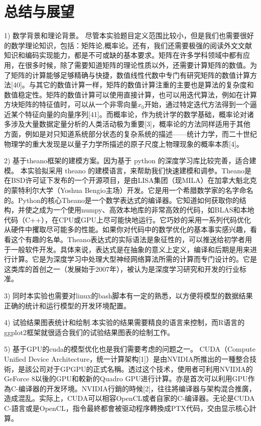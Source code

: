 \documentclass[12pt,a4paper]{article}
\begin{document}
\section{总结与展望}
1) 数学背景和理论背景。 尽管本实验题目定义范围比较小，但是我们也需要很好的数学理论知识，包括：矩阵论,概率论。还有，我们还需要极强的阅读外文文献知识和编码实现能力，都是不可或缺的基本要求。矩阵在许多学科领域中都有应用，在很多时候，除了需要知道矩阵的理论性质以外，还需要计算矩阵的数值。为了矩阵的计算能够足够精确与快捷，数值线性代数中专门有研究矩阵的数值计算方法[40]。与其它的数值计算一样，矩阵的数值计算注重的主要也是算法的复杂度和数值稳定性。矩阵的数值计算可以使用直接计算，也可以用迭代算法，例如在计算方块矩阵的特征值时，可以从一个非零向量$x_0$开始，通过特定迭代方法得到一个逼近某个特征向量的向量序列[41]。而概率论，作为统计学的数学基础，概率论对诸多涉及大量数据定量分析的人类活动极为重要[3]，概率论的方法同样适用于其他方面，例如是对只知道系统部分状态的复杂系统的描述——统计力学，而二十世纪物理学的重大发现是以量子力学所描述的原子尺度上物理现象的概率本质[4]。

2) 基于theano框架的建模方案。因为基于 python 的深度学习库比较完善，适合建模。 本实验拟采用 theano 的建模语言，来帮助我们快速建模和调参。Theano是在BSD许可证下发布的一个开源项目，是由LISA集团（现MILA）在加拿大魁北克的蒙特利尔大学（Yoshua Bengio主场）开发。它是用一个希腊数学家的名字命名的。Python的核心Theano是一个数学表达式的编译器。它知道如何获取你的结构，并使之成为一个使用numpy、高效本地库的非常高效的代码，如BLAS和本地代码（C++），在CPU或GPU上尽可能快地运行。它巧妙的采用一系列代码优化从硬件中攫取尽可能多的性能。如果你对代码中的数学优化的基本事实感兴趣，看看这个有趣的名单。Theano表达式的实际语法是象征性的，可以推送给初学者用于一般软件开发。具体来说，表达式是在抽象的意义上定义，编译和后期是用来进行计算。它是为深度学习中处理大型神经网络算法所需的计算而专门设计的。它是这类库的首创之一（发展始于2007年），被认为是深度学习研究和开发的行业标准。

3) 同时本实验也需要对linux的bash脚本有一定的熟悉，以方便将模型的数据结果正确的统计和运行模型的开发环境配置。

4) 试验结果图表统计和绘制.本实验的结果需要精良的语言来控制，而R语言的ggplot2框架就很适合我们的试验结果图表的绘制工作。

5) 基于GPU的cuda的模型优化也是我们需要考虑的问题之一。 CUDA（Compute Unified Device Architecture，统一计算架构[1]）是由NVIDIA所推出的一種整合技術，是該公司对于GPGPU的正式名稱。透过这个技术，使用者可利用NVIDIA的GeForce 8以後的GPU和較新的Quadro GPU进行计算。亦是首次可以利用GPU作為C-编译器的开发环境。NVIDIA行銷的時候[2]，往往將编译器与架构混合推廣，造成混乱。实际上，CUDA可以相容OpenCL或者自家的C-编译器。无论是CUDA C-語言或是OpenCL，指令最終都會被驱动程序轉換成PTX代码，交由显示核心計算。
\end{document}
